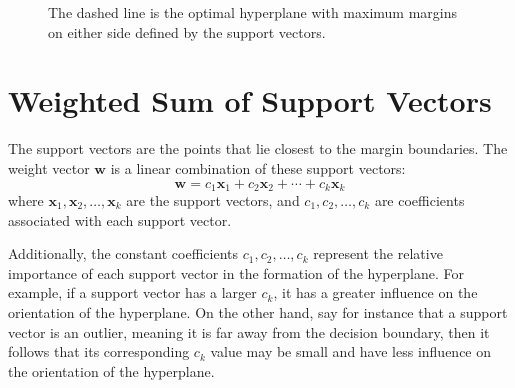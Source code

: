 \begin{figure}
    \centering
    \caption{The dashed line is the optimal hyperplane with maximum margins on either side defined by the support vectors.}
    \label{fig:maxmargin-svm}
\end{figure}

\section{Weighted Sum of Support Vectors}

The support vectors are the points that lie closest to the margin boundaries. The weight vector \( \mathbf{w} \) is a linear combination of these support vectors:
\[
\mathbf{w} = c_1 \mathbf{x}_1 + c_2 \mathbf{x}_2 + \cdots + c_k \mathbf{x}_k
\]
where \( \mathbf{x}_1, \mathbf{x}_2, \dots, \mathbf{x}_k \) are the support vectors, and \( c_1, c_2, \dots, c_k \) are coefficients associated with each support vector. 

Additionally, the constant coefficients \( c_1, c_2, \dots, c_k \) represent the relative importance of each support vector in the formation of the hyperplane. For example, if a support vector has a larger \( c_k \), it has a greater influence on the orientation of the hyperplane. On the other hand, say for instance that a support vector is an outlier, meaning it is far away from the decision boundary, then it follows that its corresponding \( c_k \) value may be small and have less influence on the orientation of the hyperplane.

